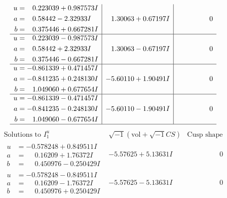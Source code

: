 \documentclass[1p]{elsarticle_modified}
\theoremstyle{definition}
\newcommand{\I}{\sqrt{-1}}
\begin{document}
$$\begin{array}{c|c|c}
\begin{aligned}
u &= \phantom{-}0.223039 + 0.987573 I \\
a &= \phantom{-}0.58442 - 2.32933 I \\
b &= \phantom{-}0.375446 + 0.667281 I\end{aligned}
 & \phantom{-}1.30063 + 0.67197 I & \phantom{-0.000000 } 0 \\ \hline\begin{aligned}
u &= \phantom{-}0.223039 - 0.987573 I \\
a &= \phantom{-}0.58442 + 2.32933 I \\
b &= \phantom{-}0.375446 - 0.667281 I\end{aligned}
 & \phantom{-}1.30063 - 0.67197 I & \phantom{-0.000000 } 0 \\ \hline\begin{aligned}
u &= -0.861339 + 0.471457 I \\
a &= -0.841235 + 0.248130 I \\
b &= \phantom{-}1.049060 + 0.677654 I\end{aligned}
 & -5.60110 + 1.90491 I & \phantom{-0.000000 } 0 \\ \hline\begin{aligned}
u &= -0.861339 - 0.471457 I \\
a &= -0.841235 - 0.248130 I \\
b &= \phantom{-}1.049060 - 0.677654 I\end{aligned}
 & -5.60110 - 1.90491 I & \phantom{-0.000000 } 0\\
 \hline 
 \end{array}$$\newpage$$\begin{array}{c|c|c}  
\text{Solutions to }I^u_{1}& \I (\text{vol} + \sqrt{-1}CS) & \text{Cusp shape}\\
 \hline 
\begin{aligned}
u &= -0.578248 + 0.849511 I \\
a &= \phantom{-}0.16209 + 1.76372 I \\
b &= \phantom{-}0.450976 - 0.250429 I\end{aligned}
 & -5.57625 + 5.13631 I & \phantom{-0.000000 } 0 \\ \hline\begin{aligned}
u &= -0.578248 - 0.849511 I \\
a &= \phantom{-}0.16209 - 1.76372 I \\
b &= \phantom{-}0.450976 + 0.250429 I\end{aligned}
 & -5.57625 - 5.13631 I & \phantom{-0.000000 } 0 \\ \hline\begin{aligned}

\end{aligned}
\end{array}$$
\end{document}
